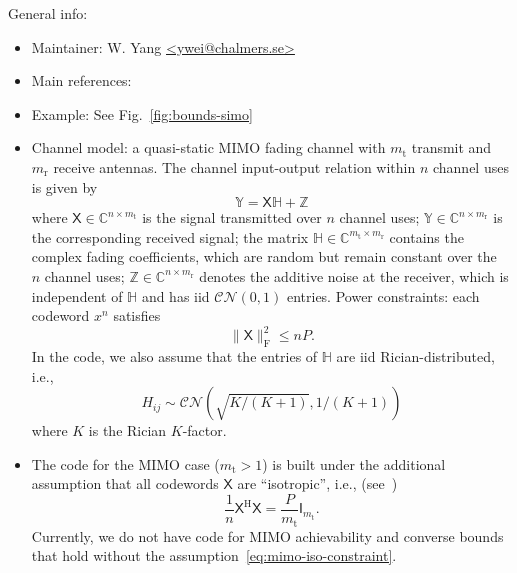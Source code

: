 \documentclass[a4paper,11p]{memoir}
\def\txant{m_{\mathrm{t}}} %
\def\rxant{m_{\mathrm{r}}} %
\def\bl{n} %
\def\complexset{\mathbb{C}}
\begin{document}
General info:
\begin{itemize}
\item Maintainer: W. Yang \url{<ywei@chalmers.se>}

\item Main references: \cite{yang14-07a}

\item Example: See Fig.~\ref{fig:bounds-simo}

\item Channel model: a quasi-static MIMO fading channel with $\txant$ transmit and $\rxant$ receive antennas. The channel input-output relation within $\bl$ channel uses is given by 
\begin{equation}
\mathbb{Y} = \mathsf{X}\mathbb{H} + \mathbb{Z}
\end{equation}
where $\mathsf{X} \in\complexset^{\bl\times\txant}$ is the signal transmitted over $\bl$ channel uses; $\mathbb{Y} \in \complexset^{\bl\times\rxant}$ is the corresponding received signal; the matrix $\mathbb{H}\in\complexset^{\txant\times\rxant}$ contains the complex fading coefficients, which are random but remain constant over the~$\bl$ channel uses;
%
 $\mathbb{Z} \in \complexset^{\bl\times\rxant}$ denotes the additive noise at the receiver, which is independent of $\mathbb{H}$ and has iid $\mathcal{CN} (0,1)$ entries. 
	Power constraints: each codeword $x^n$ satisfies
			$$ \|\mathsf{X} \|_{\mathrm{F}}^2 \le n P .$$
In the code, we also assume that  the entries of $\mathbb{H}$ are iid Rician-distributed, i.e., 
$$H_{ij} \sim \mathcal{CN} (\sqrt{K/(K+1)}, 1/(K+1))$$
where $K$ is the Rician $K$-factor. 

\item The code for the MIMO case ($\txant>1$) is built under the additional assumption that all codewords $\mathsf{X}$ are ``isotropic'', i.e.,  (see~\cite[Sec.~III]{yang14-07a})
\begin{equation}
\label{eq:mimo-iso-constraint}
 \frac{1}{\bl} \mathsf{X}^{\mathrm{H}} \mathsf{X} = \frac{P}{\txant} \mathsf{I}_{\txant}.
 \end{equation}
Currently, we do not have code for MIMO achievability and converse bounds that hold without the assumption~\eqref{eq:mimo-iso-constraint}.



\end{itemize}
\end{document}
